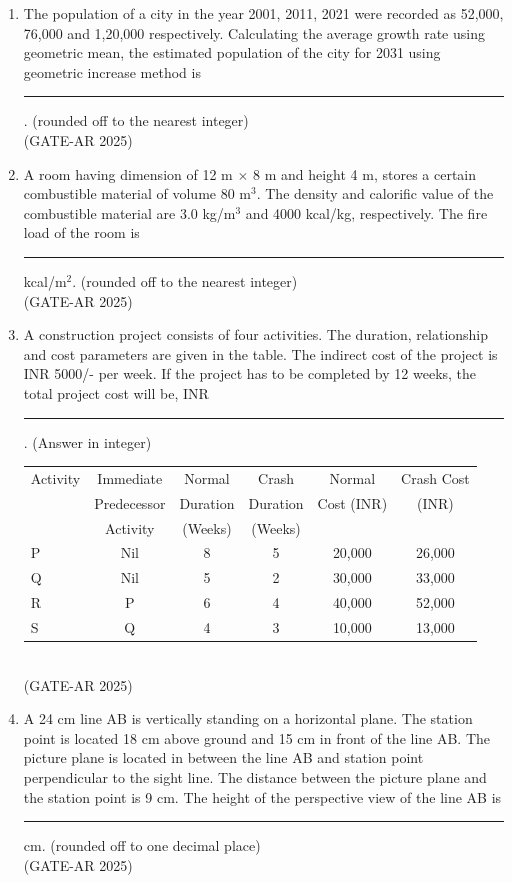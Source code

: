 \documentclass[a4paper,10pt]{article}
\begin{document}
\begin{enumerate}
\item The population of a city in the year 2001, 2011, 2021 were recorded as 52,000, 76,000 and 1,20,000 respectively. Calculating the average growth rate using geometric mean, the estimated population of the city for 2031 using geometric increase method is \rule{2cm}{0.4pt}. (rounded off to the nearest integer) \\
\hfill (GATE-AR 2025)

\item A room having dimension of 12 m $\times$ 8 m and height 4 m, stores a certain combustible material of volume 80 m$^3$. The density and calorific value of the combustible material are 3.0 kg/m$^3$ and 4000 kcal/kg, respectively. The fire load of the room is \rule{2cm}{0.4pt} kcal/m$^2$. (rounded off to the nearest integer) \\
\hfill (GATE-AR 2025)

\item A construction project consists of four activities. The duration, relationship and cost parameters are given in the table. The indirect cost of the project is INR 5000/- per week. If the project has to be completed by 12 weeks, the total project cost will be, INR\rule{2cm}{0.4pt}. (Answer in integer) \\
\begin{tabular}{ | l | c | c | c | c | c | }
\hline
Activity & Immediate & Normal & Crash & Normal & Crash Cost \\
& Predecessor & Duration & Duration & Cost (INR) & (INR) \\
& Activity & (Weeks) & (Weeks) & & \\
\hline
P & Nil & 8 & 5 & 20,000 & 26,000 \\
\hline
Q & Nil & 5 & 2 & 30,000 & 33,000 \\
\hline
R & P & 6 & 4 & 40,000 & 52,000 \\
\hline
S & Q & 4 & 3 & 10,000 & 13,000 \\
\hline
\end{tabular} \\
\hfill (GATE-AR 2025)

\item A 24 cm line AB is vertically standing on a horizontal plane. The station point is located 18 cm above ground and 15 cm in front of the line AB. The picture plane is located in between the line AB and station point perpendicular to the sight line. The distance between the picture plane and the station point is 9 cm. The height of the perspective view of the line AB is \rule{2cm}{0.4pt} cm. (rounded off to one decimal place) \\
\hfill (GATE-AR 2025)


\end{enumerate}
\end{document}
